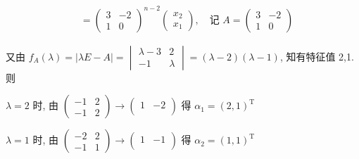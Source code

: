 \begin{align*}
                             & = \begin{pmatrix}
                                     3 & -2 \\
                                     1 & 0
                                 \end{pmatrix}^{n-2} \begin{pmatrix}
                                                         x_{2} \\
                                                         x_{1}
                                                     \end{pmatrix}, \quad \text{记 } A = \begin{pmatrix}
                                                                                            3 & -2 \\
                                                                                            1 & 0
                                                                                        \end{pmatrix}
         \end{align*}

         又由 \( f_{A}(\lambda) = |\lambda E - A| = \begin{vmatrix}
             \lambda-3 & 2       \\
             -1        & \lambda
         \end{vmatrix} = (\lambda-2)(\lambda-1) \), 知有特征值 2,1. 则

         \( \lambda = 2 \) 时, 由 \( \begin{pmatrix}
             -1 & 2 \\
             -1 & 2
         \end{pmatrix} \rightarrow \begin{pmatrix}
             1 & -2 \\
               &
         \end{pmatrix} \) 得 \( \alpha_{1} = (2,1)^{\mathrm{T}} \)

         \( \lambda = 1 \) 时, 由 \( \begin{pmatrix}
             -2 & 2 \\
             -1 & 1
         \end{pmatrix} \rightarrow \begin{pmatrix}
             1 & -1 \\
               &
         \end{pmatrix} \) 得 \( \alpha_{2} = (1,1)^{\mathrm{T}} \)


